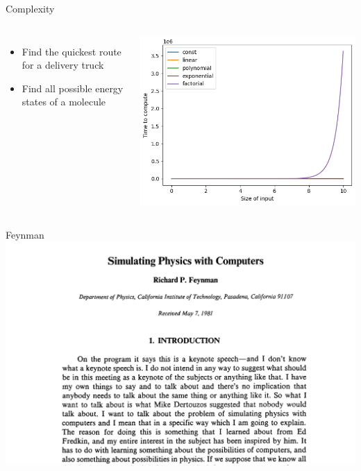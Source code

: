 \documentclass{beamer}
\begin{document}
\begin{frame}{Complexity}
    \begin{columns}
    \begin{itemize}
        \item Find the quickest route for a delivery truck \\
        \item Find all possible energy states of a molecule
    \end{itemize}
    \includegraphics[width=\columnwidth]{images/complex4.png}
    \end{columns}
\end{frame}

\begin{frame}{Feynman}
    \includegraphics[width=\columnwidth]{images/feynman_paper.png}
\end{frame}
\end{document}
